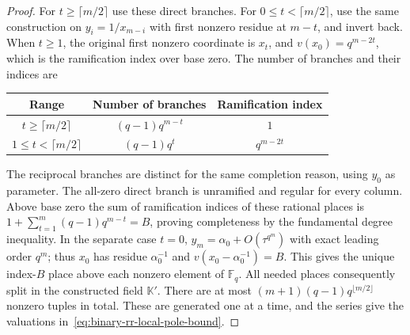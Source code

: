 \documentclass[11pt,letterpaper]{article}
\numberwithin{equation}{section}
\begin{document}
\begin{proof}
For $t\geq\lceil m/2\rceil$ use these direct branches.
For $0\leq t<\lceil m/2\rceil$, use the same construction on $y_i=1/x_{m-i}$ with first nonzero residue at $m-t$, and invert back.
When $t\geq1$, the original first nonzero coordinate is $x_t$, and $v(x_0)=q^{m-2t}$, which is the ramification index over base zero.
The number of branches and their indices are
\begin{center}
\begin{tabular}{@{}ccc@{}}
\toprule
Range & Number of branches & Ramification index\\
\midrule
$t\geq\lceil m/2\rceil$ & $(q-1)q^{m-t}$ & $1$\\
$1\leq t<\lceil m/2\rceil$ & $(q-1)q^t$ & $q^{m-2t}$\\
\bottomrule
\end{tabular}
\end{center}
The reciprocal branches are distinct for the same completion reason, using $y_0$ as parameter.
The all-zero direct branch is unramified and regular for every column.
Above base zero the sum of ramification indices of these rational places is $1+\sum_{t=1}^m(q-1)q^{m-t}=B$, proving completeness by the fundamental degree inequality.
In the separate case $t=0$, $y_m=\alpha_0+O(\tau^{q^m})$ with exact leading order $q^m$; thus $x_0$ has residue $\alpha_0^{-1}$ and $v(x_0-\alpha_0^{-1})=B$.
This gives the unique index-$B$ place above each nonzero element of $\mathbb F_q$.
All needed places consequently split in the constructed field $\mathbb K'$.
There are at most $(m+1)(q-1)q^{\lfloor m/2\rfloor}$ nonzero tuples in total.
These are generated one at a time, and the series give the valuations in~\eqref{eq:binary-rr-local-pole-bound}.


\end{proof}
\end{document}
